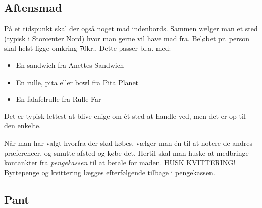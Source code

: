 \subsection{Aftensmad}
\label{sec:intra:aftensmad}
På et tidspunkt skal der også noget mad indenbords. 
Sammen vælger man et sted (typisk i Storcenter Nord) 
hvor man gerne vil have mad fra.
Beløbet pr. person skal helst ligge omkring 70kr..
Dette passer bl.a. med:
\begin{itemize}
    \item En sandwich fra Anettes Sandwich
    \item En rulle, pita eller bowl fra Pita Planet
    \item En falafelrulle fra Rulle Far
\end{itemize}
Det er typisk lettest at blive enige om ét sted at handle ved, 
men det er op til den enkelte.

Når man har valgt hvorfra der skal købes, 
vælger man én til at notere de andres præferencer, 
og smutte afsted og købe det.
Hertil skal man huske at medbringe kontankter fra 
\textit{pengekassen} til at betale for maden. 
HUSK KVITTERING!
Byttepenge og kvittering lægges efterfølgende tilbage i pengekassen.

\subsection{Pant}
\label{sec:intra:pant}

